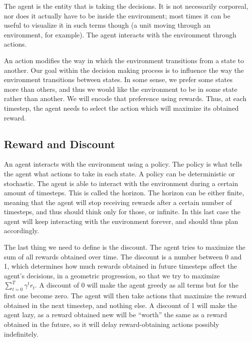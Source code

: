 \documentclass{article}
\begin{document}
The agent is the entity that is taking the decisions. It is not necessarily corporeal, nor does it actually have to be inside the environment; most times it can be useful to visualize it in such terms though (a unit moving through an environment, for example).
The agent interacts with the environment through actions. 

An action modifies the way in which the environment transitions from a state to another. 
Our goal within the decision making process is to influence the way the environment transitions between states. In some sense, we prefer some states more than others, and thus we would like the environment to be in some state rather than another. We will encode that preference using rewards.
Thus, at each timestep, the agent needs to select the action which will maximize its obtained reward.

\subsection{Reward and Discount}
An agent interacts with the environment using a policy. The policy is what tells the agent what actions to take in each state. A policy can be deterministic or stochastic.
The agent is able to interact with the environment during a certain amount of timesteps. This is called the horizon. The horizon can be either finite, meaning that the agent will stop receiving rewards after a certain number of timesteps, and thus should think only for those, or infinite. In this last case the agent will keep interacting with the environment forever, and should thus plan accordingly.

The last thing we need to define is the discount. The agent tries to maximize the sum of all rewards obtained over time. The discount is a number between 0 and 1, which determines how much rewards obtained in future timesteps affect the agent's decisions, in a geometric progression, so that we try to maximize $\sum_{t=0}^{T} \gamma^t r_t.$ A discount of 0 will make the agent greedy as all terms but for the first one become zero. 
The agent will then take actions that maximize the reward obtained in the next timestep, and nothing else. 
A discount of 1 will make the agent lazy, as a reward obtained new will be ``worth'' the same as a reward obtained in the future,
so it will delay reward-obtaining actions possibly indefinitely.
\end{document}
